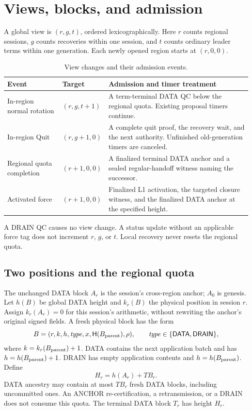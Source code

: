 \documentclass[11pt,a4paper]{article}
\newcommand{\Hash}{\mathsf H}
\newcommand{\tagg}[1]{\ensuremath{\mathsf{#1}}}
\begin{document}
\section{Views, blocks, and admission}
\label{sec:definitions}
A global view is $(r,g,t)$, ordered lexicographically. Here $r$ counts
regional sessions, $g$ counts recoveries within one session, and $t$ counts
ordinary leader terms within one generation. Each newly opened region
starts at $(r,0,0)$.

\begin{table}[htbp]\centering\small
\caption{View changes and their admission events.}
\label{tab:views}
\begin{tabularx}{\linewidth}{@{}p{.24\linewidth}p{.27\linewidth}Y@{}}
\toprule
Event & Target & Admission and timer treatment\\
\midrule
In-region normal rotation & $(r,g,t+1)$ & A term-terminal DATA QC below
the regional quota. Existing proposal timers continue.\\
In-region Quit & $(r,g+1,0)$ & A complete quit proof, the recovery wait,
and the next authority. Unfinished old-generation timers are canceled.\\
Regional quota completion & $(r+1,0,0)$ & A finalized terminal DATA anchor
and a sealed regular-handoff witness naming the successor.\\
Activated force & $(r+1,0,0)$ & Finalized L1 activation, the targeted
closure witness, and the finalized DATA anchor at the specified height.\\
\bottomrule
\end{tabularx}
\end{table}
A DRAIN QC causes no view change. A status update without an applicable
force tag does not increment $r$, $g$, or $t$. Local recovery never resets
the regional quota.

\subsection{Two positions and the regional quota}
\label{sec:positions}
The unchanged DATA block $A_r$ is the session's cross-region anchor;
$A_0$ is genesis. Let $h(B)$ be global DATA height and $k_r(B)$ the
physical position in session $r$. Assign $k_r(A_r)=0$ for this session's
arithmetic, without rewriting the anchor's original signed fields.
A fresh physical block has the form
\[
 B=(r,k,h,\mathit{type},x,\Hash(B_{\rm parent}),\rho),
 \qquad \mathit{type}\in\{\tagg{DATA},\tagg{DRAIN}\},
\]
where $k=k_r(B_{\rm parent})+1$. DATA contains the next application batch
and has $h=h(B_{\rm parent})+1$. DRAIN has empty application contents
and $h=h(B_{\rm parent})$. Define
\[
 H_r=h(A_r)+TB_r.
\]
DATA ancestry may contain at most $TB_r$ fresh DATA blocks, including
uncommitted ones. An ANCHOR re-certification, a retransmission, or a DRAIN
does not consume this quota. The terminal DATA block $T_r$ has height $H_r$.
\end{document}
